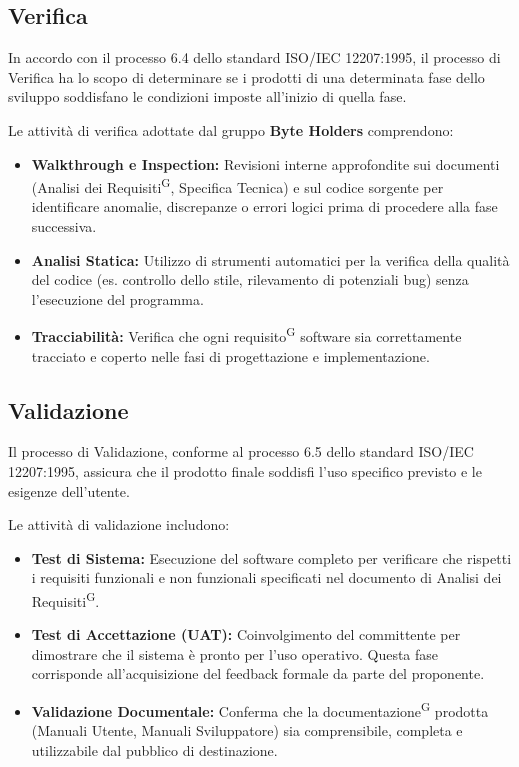 \documentclass[a4paper, 11pt]{article}
\begin{document}
\subsection{Verifica}

In accordo con il processo 6.4 dello standard ISO/IEC 12207:1995, il processo di Verifica ha lo scopo di determinare se i prodotti di una determinata fase dello sviluppo soddisfano le condizioni imposte all'inizio di quella fase.

Le attività di verifica adottate dal gruppo \textbf{Byte Holders} comprendono:
\begin{itemize}
    \item \textbf{Walkthrough e Inspection:} Revisioni interne approfondite sui documenti (Analisi dei Requisiti\textsuperscript{G}, Specifica Tecnica) e sul codice sorgente per identificare anomalie, discrepanze o errori logici prima di procedere alla fase successiva.
    \item \textbf{Analisi Statica:} Utilizzo di strumenti automatici per la verifica della qualità del codice (es. controllo dello stile, rilevamento di potenziali bug) senza l'esecuzione del programma.
    \item \textbf{Tracciabilità:} Verifica che ogni requisito\textsuperscript{G} software sia correttamente tracciato e coperto nelle fasi di progettazione e implementazione.
\end{itemize}

\subsection{Validazione}

Il processo di Validazione, conforme al processo 6.5 dello standard ISO/IEC 12207:1995, assicura che il prodotto finale soddisfi l'uso specifico previsto e le esigenze dell'utente.

Le attività di validazione includono:
\begin{itemize}
    \item \textbf{Test di Sistema:} Esecuzione del software completo per verificare che rispetti i requisiti funzionali e non funzionali specificati nel documento di Analisi dei Requisiti\textsuperscript{G}.
    \item \textbf{Test di Accettazione (UAT):} Coinvolgimento del committente per dimostrare che il sistema è pronto per l'uso operativo. Questa fase corrisponde all'acquisizione del feedback formale da parte del proponente.
    \item \textbf{Validazione Documentale:} Conferma che la documentazione\textsuperscript{G} prodotta (Manuali Utente, Manuali Sviluppatore) sia comprensibile, completa e utilizzabile dal pubblico di destinazione.
\end{itemize}
\end{document}
